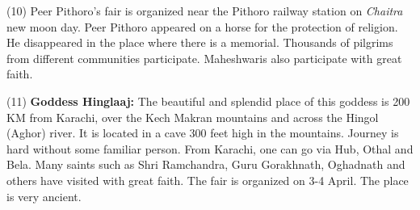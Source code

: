(10) Peer Pithoro's fair is organized near the Pithoro railway station on
\textit{Chaitra} new moon day. Peer Pithoro appeared on a horse for the
protection of religion. He disappeared in the place where there is a memorial.
Thousands of pilgrims from different communities participate. Maheshwaris also
participate with great faith. 

(11) \textbf{Goddess Hinglaaj:} The beautiful and splendid place of this
goddess is 200 KM from Karachi, over the Kech Makran mountains and across the
Hingol (Aghor) river. It is located in a cave 300 feet high in the mountains.
Journey is hard without some familiar person. From Karachi, one can go via Hub,
Othal and Bela. Many saints such as Shri Ramchandra, Guru Gorakhnath, Oghadnath
and others have visited with great faith. The fair is organized on 3-4 April.
The place is very ancient.

